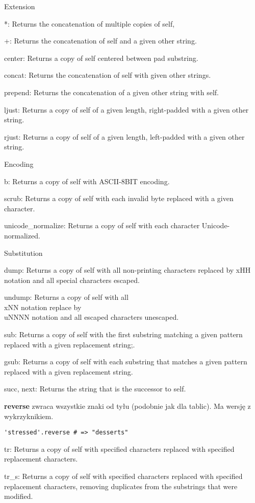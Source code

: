 Extension

*: Returns the concatenation of multiple copies of self,

+: Returns the concatenation of self and a given other string.

center: Returns a copy of self centered between pad substring.

concat: Returns the concatenation of self with given other strings.

prepend: Returns the concatenation of a given other string with self.

ljust: Returns a copy of self of a given length, right-padded with a given other string.

rjust: Returns a copy of self of a given length, left-padded with a given other string.

Encoding

b: Returns a copy of self with ASCII-8BIT encoding.

scrub: Returns a copy of self with each invalid byte replaced with a given character.

unicode\_normalize: Returns a copy of self with each character Unicode-normalized.


Substitution

dump: Returns a copy of self with all non-printing characters replaced by xHH notation and all special characters escaped.

undump: Returns a copy of self with all \\xNN notation replace by \\uNNNN notation and all escaped characters unescaped.

sub: Returns a copy of self with the first substring matching a given pattern replaced with a given replacement string;.

gsub: Returns a copy of self with each substring that matches a given pattern replaced with a given replacement string.

succ, next: Returns the string that is the successor to self.

\textbf{reverse} zwraca wszystkie znaki od tyłu (podobnie jak dla tablic).
Ma wersję z wykrzyknikiem.
\begin{verbatim}
'stressed'.reverse # => "desserts"
\end{verbatim}

tr: Returns a copy of self with specified characters replaced with specified replacement characters.

tr\_s: Returns a copy of self with specified characters replaced with specified replacement characters, removing duplicates from the substrings that were modified.

